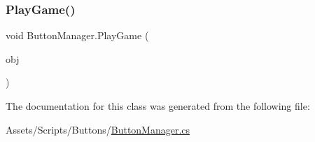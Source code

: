 \subsubsection{\texorpdfstring{Play\+Game()}{PlayGame()}}
{\footnotesize\ttfamily void Button\+Manager.\+Play\+Game (\begin{DoxyParamCaption}\item[{Game\+Object}]{obj }\end{DoxyParamCaption})\hspace{0.3cm}{\ttfamily [inline]}}



The documentation for this class was generated from the following file\+:\begin{DoxyCompactItemize}
\item 
Assets/\+Scripts/\+Buttons/\mbox{\hyperlink{_button_manager_8cs}{Button\+Manager.\+cs}}\end{DoxyCompactItemize}
